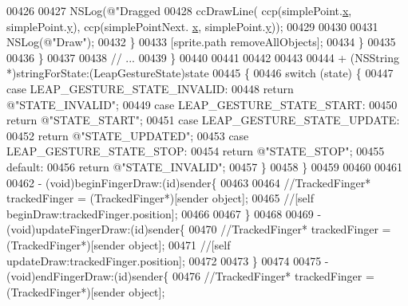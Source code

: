 \begin{DoxyCode}
{{{{{{{{{{{{00426                 
00427                 NSLog(\textcolor{stringliteral}{@"Dragged %
00428                 ccDrawLine( ccp(simplePoint.\hyperlink{interface_simple_point_abb16aaf6215e9e946606b30199b1c3af}{x}, simplePoint.\hyperlink{interface_simple_point_ae10ba2c5156e6061258a0720443cd1c8}{y}), ccp(simplePointNext.
      \hyperlink{interface_simple_point_abb16aaf6215e9e946606b30199b1c3af}{x}, simplePoint.\hyperlink{interface_simple_point_ae10ba2c5156e6061258a0720443cd1c8}{y}));
00429                 
00430                 
00431                 NSLog(\textcolor{stringliteral}{@"Draw"});
00432             \}
00433             [sprite.path removeAllObjects];
00434         \}
00435         
00436     \}
00437     
00438     \textcolor{comment}{// ...}
00439 \}
00440 
00441 
00442 
00443 
00444 + (NSString *)stringForState:(LeapGestureState)state
00445 \{
00446     \textcolor{keywordflow}{switch} (state) \{
00447         \textcolor{keywordflow}{case} LEAP\_GESTURE\_STATE\_INVALID:
00448             \textcolor{keywordflow}{return} \textcolor{stringliteral}{@"STATE\_INVALID"};
00449         \textcolor{keywordflow}{case} LEAP\_GESTURE\_STATE\_START:
00450             \textcolor{keywordflow}{return} \textcolor{stringliteral}{@"STATE\_START"};
00451         \textcolor{keywordflow}{case} LEAP\_GESTURE\_STATE\_UPDATE:
00452             \textcolor{keywordflow}{return} \textcolor{stringliteral}{@"STATE\_UPDATED"};
00453         \textcolor{keywordflow}{case} LEAP\_GESTURE\_STATE\_STOP:
00454             \textcolor{keywordflow}{return} \textcolor{stringliteral}{@"STATE\_STOP"};
00455         \textcolor{keywordflow}{default}:
00456             \textcolor{keywordflow}{return} \textcolor{stringliteral}{@"STATE\_INVALID"};
00457     \}
00458 \}
00459 
00460 
00461 
00462 - (void)beginFingerDraw:(\textcolor{keywordtype}{id})sender\{
00463     
00464     \textcolor{comment}{//TrackedFinger* trackedFinger = (TrackedFinger*)[sender object];}
00465     \textcolor{comment}{//[self beginDraw:trackedFinger.position];}
00466     
00467 \}
00468 
00469 - (void)updateFingerDraw:(\textcolor{keywordtype}{id})sender\{
00470     \textcolor{comment}{//TrackedFinger* trackedFinger = (TrackedFinger*)[sender object];}
00471     \textcolor{comment}{//[self updateDraw:trackedFinger.position];}
00472     
00473 \}
00474 
00475 - (void)endFingerDraw:(\textcolor{keywordtype}{id})sender\{
00476     \textcolor{comment}{//TrackedFinger* trackedFinger = (TrackedFinger*)[sender object];}
}}}}}}}}}}}}}
\end{DoxyCode}
